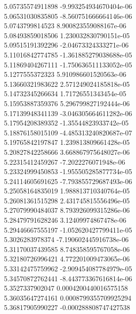 {5.05735574911898 -9.993254934670404e-06 \\
5.06531030835805 -8.560751666664146e-06 \\
5.0743799814523 8.900823559088167e-06 \\
5.08493859018506 1.230032830790151e-05 \\
5.09515191392296 -2.04673324333271e-06 \\
5.11016842774785 -1.361885279038688e-05 \\
5.11869404267111 -1.750636511133052e-05 \\
5.1277555372323 5.910986601520563e-06 \\
5.13660321983622 2.571249024185818e-05 \\
5.14732345266634 1.71726551343454e-05 \\
5.15953887359376 5.296799827192444e-06 \\
5.17139948341139 -3.046305664611282e-06 \\
5.17954208389352 -1.35544823933742e-05 \\
5.18876158015109 -4.485313240820687e-07 \\
5.19765842197847 1.239813809661428e-05 \\
5.20827842258666 3.668867975648027e-06 \\
5.22315412459267 -7.2022276071948e-06 \\
5.23324999450853 -1.955505285877734e-05 \\
5.24114605691625 -7.793855729687493e-06 \\
5.25058164835019 1.988813710340764e-05 \\
5.26081361515298 2.431745815556496e-05 \\
5.27079990484037 8.793926099315286e-06 \\
5.28479791628246 3.12409974867478e-06 \\
5.29446667555197 -1.052620427799411e-05 \\
5.3026283978374 -7.190602445916738e-06 \\
5.31170037439585 8.748358595767058e-06 \\
5.32180726996421 4.772201009473065e-06 \\
5.33142475759962 -2.909454087784979e-05 \\
5.34570872762441 -8.443773367616814e-06 \\
5.3527337902047 0.0004200440016575158 \\
5.36035647274161 0.0008799355709925294 \\
5.36817905990227 -0.000288808747427538 \\
}
